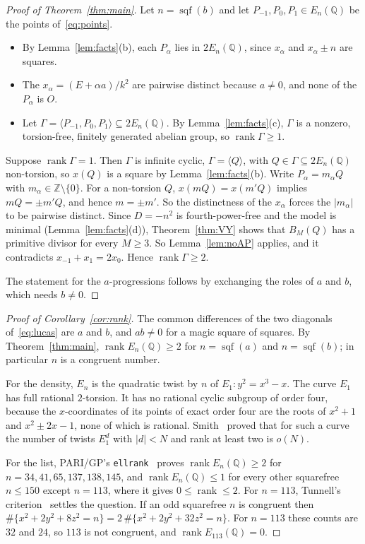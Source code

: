 \documentclass[11pt]{amsart}
\theoremstyle{definition}
\theoremstyle{remark}
\newcommand{\Q}{\mathbb{Q}}
\newcommand{\Z}{\mathbb{Z}}
\DeclareMathOperator{\sqf}{sqf}
\DeclareMathOperator{\rk}{rank}
\begin{document}
\begin{proof}[Proof of Theorem~\ref{thm:main}]
Let $n=\sqf(b)$ and let $P_{-1},P_0,P_1\in E_n(\Q)$ be the points of~\eqref{eq:points}.
\begin{itemize}
\item By Lemma~\ref{lem:facts}(b), each $P_\alpha$ lies in $2E_n(\Q)$, since $x_\alpha$ and
$x_\alpha\pm n$ are squares.
\item The $x_\alpha=(E+\alpha a)/k^2$ are pairwise distinct because $a\neq0$, and none of the $P_\alpha$
is $O$.
\item Let $\Gamma=\langle P_{-1},P_0,P_1\rangle\subseteq2E_n(\Q)$. By Lemma~\ref{lem:facts}(c), $\Gamma$ is
a nonzero, torsion-free, finitely generated abelian group, so $\rk\Gamma\ge1$.
\end{itemize}
Suppose $\rk\Gamma=1$. Then $\Gamma$ is infinite cyclic, $\Gamma=\langle Q\rangle$, with
$Q\in\Gamma\subseteq2E_n(\Q)$ non-torsion, so $x(Q)$ is a square by Lemma~\ref{lem:facts}(b). Write
$P_\alpha=m_\alpha Q$ with $m_\alpha\in\Z\setminus\{0\}$. For a non-torsion $Q$, $x(mQ)=x(m'Q)$ implies
$mQ=\pm m'Q$, and hence $m=\pm m'$. So the distinctness of the $x_\alpha$ forces the $|m_\alpha|$ to be
pairwise distinct. Since $D=-n^2$ is fourth-power-free and the model is minimal
(Lemma~\ref{lem:facts}(d)), Theorem~\ref{thm:VY} shows that $B_M(Q)$ has a primitive divisor for every
$M\ge3$. So Lemma~\ref{lem:noAP} applies, and it contradicts $x_{-1}+x_1=2x_0$. Hence $\rk\Gamma\ge2$.

The statement for the $a$-progressions follows by exchanging the roles of $a$ and $b$, which needs
$b\neq0$.
\end{proof}

\begin{proof}[Proof of Corollary~\ref{cor:rank}]
The common differences of the two diagonals of~\eqref{eq:lucas} are $a$ and $b$, and $ab\ne0$ for a
magic square of squares. By Theorem~\ref{thm:main}, $\rk E_n(\Q)\ge2$ for $n=\sqf(a)$ and $n=\sqf(b)$; in
particular $n$ is a congruent number.

For the density, $E_n$ is the quadratic twist by $n$ of $E_1\colon y^2=x^3-x$. The curve $E_1$ has full
rational $2$-torsion. It has no rational cyclic subgroup of order four, because the $x$-coordinates of
its points of exact order four are the roots of $x^2+1$ and $x^2\pm2x-1$, none of which is rational.
Smith~\cite{Smith} proved that for such a curve the number of twists $E_1^d$ with $|d|<N$ and rank at
least two is $o(N)$.

For the list, PARI/GP's \texttt{ellrank}~\cite{PARI} proves $\rk E_n(\Q)\ge2$ for $n=34,41,65,137,138,145$,
and $\rk E_n(\Q)\le1$ for every other squarefree $n\le150$ except $n=113$, where it gives
$0\le\rk\le2$. For $n=113$, Tunnell's criterion~\cite{Tunnell} settles the question. If an odd
squarefree $n$ is congruent then
$\#\{x^2+2y^2+8z^2=n\}=2\,\#\{x^2+2y^2+32z^2=n\}$. For $n=113$ these counts are $32$ and $24$, so $113$
is not congruent, and $\rk E_{113}(\Q)=0$.
\end{proof}
\end{document}
